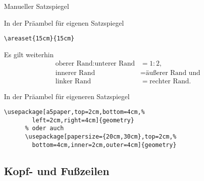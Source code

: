 \begin{Frame}[fragile]{Manueller Satzspiegel}
  \begin{Block}{In der Präambel für eigenen Satzspiegel}
    \begin{lstlisting}[gobble=6,style=block]
      \areaset{15cm}{15cm}
    \end{lstlisting}
    Es gilt weiterhin
    \begin{align*}
      \text{oberer\ Rand} : \text{unterer\ Rand} &= 1 : 2, \\
      \text{innerer\ Rand} &= \text{äußerer\ Rand} \text{ und} \\
      \text{linker\ Rand} &= \text{rechter\ Rand}.
    \end{align*}
  \end{Block}

  \xxx

  \begin{Block}{In der Präambel für eigeneren Satzspiegel}
    \begin{lstlisting}[gobble=6,style=block]
      \usepackage[a5paper,top=2cm,bottom=4cm,%
        left=2cm,right=4cm]{geometry}
      % oder auch
      \usepackage[papersize={20cm,30cm},top=2cm,%
        bottom=4cm,inner=2cm,outer=4cm]{geometry}
    \end{lstlisting}
  \end{Block}
\end{Frame}

\subsection{Kopf- und Fußzeilen}

